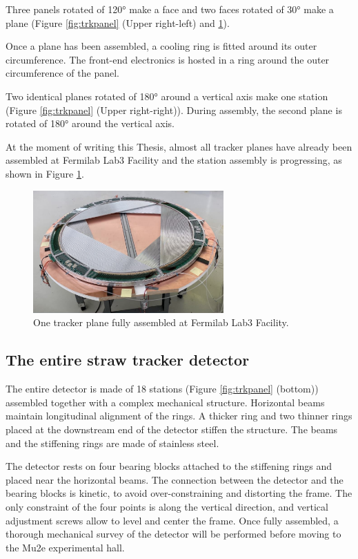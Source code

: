Three panels rotated of 120° make a face and two faces rotated of 
30° make a plane (Figure \ref{fig:trkpanel} (Upper right-left) and \ref{fig:trueplane}).

Once a plane has been assembled, a cooling ring is fitted around its outer circumference. 
The front-end electronics is hosted in a ring around the outer 
circumference of the panel.

Two identical planes rotated of 180° around a vertical axis make one station 
(Figure \ref{fig:trkpanel} (Upper right-right)). 
During assembly, the second plane is rotated of 180° around the vertical axis.

At the moment of writing this Thesis, almost all tracker planes have 
already been assembled at Fermilab Lab3 Facility and the station assembly is progressing, 
as shown in Figure \ref{fig:trueplane}.

\begin{figure}[!h]
    \centering
    \includegraphics[width =0.65\textwidth]{figures/png/Screenshot_20240706_163056.png}
    \caption[One tracker plane fully assembled.]{One tracker plane fully assembled at Fermilab Lab3 Facility.}
    \label{fig:trueplane}
\end{figure}
\subsection{The entire straw tracker detector}

The entire detector is made of 18 stations (Figure \ref{fig:trkpanel} 
(bottom)) assembled together with a complex mechanical structure. 
Horizontal beams maintain longitudinal alignment of the rings. 
A thicker ring and two thinner rings placed at the downstream end 
of the detector stiffen the structure. The beams and the stiffening rings 
are made of stainless steel.

The detector rests on four bearing blocks attached to the 
stiffening rings and placed near the horizontal beams.
The connection between the detector and the bearing blocks 
is kinetic, to avoid over-constraining and distorting the frame. 
The only constraint of the four points is along the vertical 
direction, and vertical adjustment screws allow to level and 
center the frame. Once fully assembled, a thorough mechanical 
survey of the detector will be performed before moving to the Mu2e experimental hall. 
